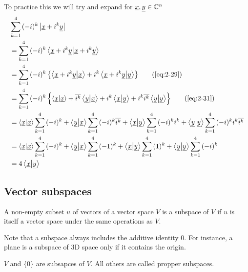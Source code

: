 \documentclass{article}
\numberwithin{equation}{section}
\begin{document}
\begin{eg}
    To practice this we will try and expand for $\underline{x}, \underline{y} \in \mathbb{C}^n$   
    \begin{align*}
        &\sum_{k=1}^{4}{(-i)^k \abs{\vec{x} + i^k \vec{y}}} \\
        &= \sum_{k=1}^{4}{(-i)^k \braket{\vec{x} + i^k \vec{y}}{\vec{x} + i^k \vec{y}}} \\
        &= \sum_{k=1}^{4}{(-i)^k \crbkt{\braket{\vec{x} + i^k \vec{y}}{\vec{x}} + i^k\braket{\vec{x} + i^k \vec{y}}{\vec{y}}}} \tag{\ref{eq:2-29}}\\
        &= \sum_{k=1}^{4}{(-i)^k \crbkt{\braket{\vec{x}}{\vec{x}} + \overline{i^k}\braket{\vec{y}}{\vec{x}} + i^k\braket{\vec{x}}{\vec{y}} + i^k \overline{i^k}\braket{\vec{y}}{\vec{y}}}} \tag{\ref{eq:2-31}}\\
        &= \braket{\vec{x}}{\vec{x}}\sum_{k=1}^{4}{(-i)^k}  + \braket{\vec{y}}{\vec{x}}\sum_{k=1}^{4}{(-i)^k\overline{i^k}} + \braket{\vec{x}}{\vec{y}}\sum_{k=1}^{4}{(-i)^ki^k} + \braket{\vec{y}}{\vec{y}}\sum_{k=1}^{4}{(-i)^k i^k \overline{i^k}} \\
        &= \braket{\vec{x}}{\vec{x}}\sum_{k=1}^{4}{(-i)^k}  + \braket{\vec{y}}{\vec{x}}\sum_{k=1}^{4}{(-1)^k} + \braket{\vec{x}}{\vec{y}}\sum_{k=1}^{4}{(1)^k} + \braket{\vec{y}}{\vec{y}}\sum_{k=1}^{4}{(-i)^k}\\
        &= 4\braket{\vec{x}}{\vec{y}}
    \end{align*}
\end{eg}

\subsection{Vector subspaces}
\begin{defi}
    A non-empty subset $u$ of vectors of a vector space $V$ is a subspace of $V$ if $u$ is itself a vector space under the same operations as $V$.
\end{defi}

\begin{remark}
    Note that a subspace always includes the additive identity $0$. For instance, a plane is a subspace of 3D space only if it contains the origin.
\end{remark}

\begin{eg}
    $V$ and $\{0\}$ are subsapces of $V$. All others are called propper subspaces.
\end{eg}
\end{document}
